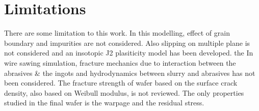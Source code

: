  \section{Limitations}
 
There are some limitation to this work. In this modelling, effect of grain boundary and impurities are not considered. Also slipping on multiple plane is not considered and an insotopic J2 plasiticity model has been developed. the In wire sawing simulation, fracture mechanics due to interaction between the abrasives \& the ingots and hydrodynamics between slurry and abrasives has not been considered. The fracture strength of wafer based on the surface crack density, also based on Weibull modulus, is not reviewed. The only properties studied in the final wafer is the warpage and the residual stress. 